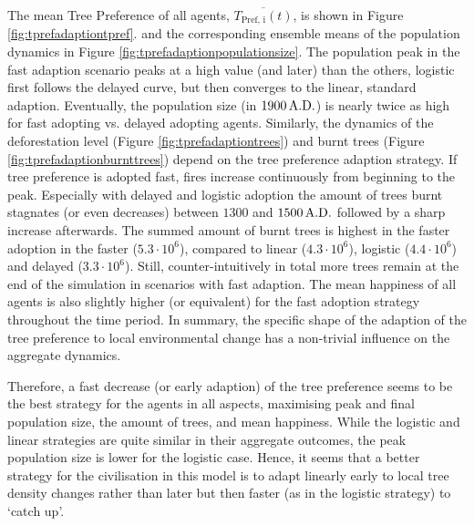 The mean Tree Preference of all agents, $\overline{T_\text{Pref, i}(t)}$, is shown in Figure \ref{fig:tprefadaptiontpref}.
and the corresponding ensemble means of the population dynamics in Figure \ref{fig:tprefadaptionpopulationsize}.
The population peak in the fast adaption scenario peaks at a high value (and later) than the others, logistic first follows the delayed curve, but then converges to the linear, standard adaption.
Eventually, the population size (in $1900\, {\rm A.D.}$) is nearly twice as high for fast adopting vs. delayed adopting agents.
Similarly, the dynamics of the deforestation level (Figure \ref{fig:tprefadaptiontrees}) and burnt trees (Figure \ref{fig:tprefadaptionburnttrees}) depend on the tree preference adaption strategy. 
If tree preference is adopted fast, fires increase continuously from beginning to the peak. 
Especially with delayed and logistic adoption the amount of trees burnt stagnates (or even decreases) between $1300$ and $1500\,{\rm A.D.}$ followed by a sharp increase afterwards.
The summed amount of burnt trees is highest in the faster adoption in the faster ($5.3\cdot 10^6$), compared to linear ($4.3\cdot 10^6$), logistic ($4.4\cdot 10^6$) and delayed ($3.3\cdot 10^6$).
Still, counter-intuitively in total more trees remain at the end of the simulation in scenarios with fast adaption.
The mean happiness of all agents is also slightly higher (or equivalent) for the fast adoption strategy throughout the time period.
In summary, the specific shape of the adaption of the tree preference to local environmental change has a non-trivial influence on the aggregate dynamics.

Therefore, a fast decrease (or early adaption) of the tree preference seems to be the best strategy for the agents in all aspects, maximising peak and final population size, the amount of trees, and mean happiness.
While the logistic and linear strategies are quite similar in their aggregate outcomes, the peak population size is lower for the logistic case.
Hence, it seems that a better strategy for the civilisation in this model is to adapt linearly early to local tree density changes rather than later but then faster (as in the logistic strategy) to `catch up'.

